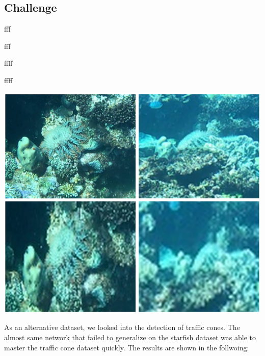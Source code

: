 \documentclass[landscape,a2,final,12pt]{issposter}
\begin{document}
\begin{multicols}{3}
\begin{samepage}
\begin{minipage}[t]{0.3\textwidth}
\begin{small}
            \end{small}
        \end{minipage}
    \end{samepage}
    \columnbreak
    \begin{samepage}
    \section{Challenge}
        \begin{minipage}[t]{0.32\textwidth}
            \begin{scriptsize}fff

                fff

                ffff

                ffff

                \begin{center}
                    \includegraphics[scale=0.3]{6_img_quality.png}
                \end{center}

                As an alternative dataset, we looked into the detection of traffic cones. The almost same network that failed to generalize on the starfish dataset was able to master the traffic cone dataset quickly.
                The results are shown in the follwoing:
                
                

            \end{scriptsize}
        \end{minipage}
    \end{samepage}
\end{multicols}
\end{document}
